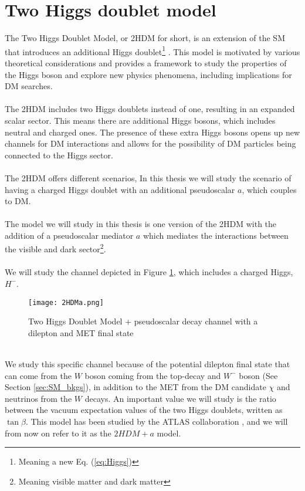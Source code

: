 \documentclass[12pt, a4paper]{book}
\begin{document}
\section{Two Higgs doublet model}
The Two Higgs Doublet Model, or 2HDM for short, is an extension of the SM that introduces an additional Higgs doublet\footnote{Meaning a new Eq. (\ref{eq:Higgs})} \cite{Branco:2011iw}. This model is motivated by various theoretical considerations and provides a framework to study the 
properties of the Higgs boson and explore new physics phenomena, including implications for DM searches.\\
\\The 2HDM includes two Higgs doublets instead of one, resulting in an expanded scalar sector. This means there are additional Higgs bosons, which includes neutral and charged ones. The presence of 
these extra Higgs bosons opens up new channels for DM interactions and allows for the possibility of DM particles being connected to the Higgs sector.\\
\\The 2HDM offers different scenarios, In this thesis we will study the scenario of having a charged Higgs doublet with an additional pseudoscalar $a$, which couples to DM. \\
\\The model we will study in this thesis is one version of the 2HDM with the addition of a pseudoscalar mediator $a$ which mediates the interactions between the visible and dark sector\footnote{Meaning visible matter and dark matter}.\\
\\We will study the channel depicted in Figure \ref{fig:2HDMa}, which includes a charged Higgs, $H^-$.  
\begin{figure}[!ht]
    \centering
    \texttt{[image: 2HDMa.png]}
    \caption[2HDM + a model]{Two Higgs Doublet Model + pseudoscalar decay channel with a dilepton and MET final state}\label{fig:2HDMa}
\end{figure}
\\ We study this specific channel because of the potential dilepton final state that can come from the $W$ boson coming from the top-decay and $W^-$ boson (See Section \ref{sec:SM_bkgs}), in addition to the MET from the DM candidate $\chi$ and neutrinos from the $W$ decays. 
An important value we will study is the ratio between the vacuum expectation values of the two Higgs doublets, written as $\tan\beta$. 
This model has been studied by the ATLAS collaboration \cite{ATLAS-CONF-2021-036}, and we will from now on refer to it as the $2HDM + a$ model.
\end{document}
